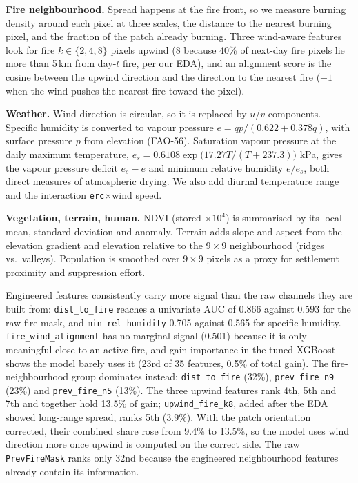 \textbf{Fire neighbourhood.} Spread happens at the fire front, so we measure burning density
around each pixel at three scales, the distance to the nearest burning pixel, and the fraction of
the patch already burning. Three wind-aware features look for fire $k \in \{2,4,8\}$ pixels upwind (8 because 40\% of
next-day fire pixels lie more than 5\,km from day-$t$ fire, per our EDA), and an
alignment score is the cosine between the upwind direction and the direction to the nearest fire
($+1$ when the wind pushes the nearest fire toward the pixel).

\textbf{Weather.} Wind direction is circular, so it is replaced by $u$/$v$ components.
Specific humidity is converted to vapour pressure $e = qp/(0.622+0.378q)$, with surface pressure
$p$ from elevation (FAO-56). Saturation vapour pressure at the daily maximum temperature,
$e_s = 0.6108\exp\!\big(17.27T/(T+237.3)\big)$ kPa, gives the vapour pressure deficit
$e_s - e$ and minimum relative humidity $e/e_s$, both direct measures of atmospheric drying.
We also add diurnal temperature range and the interaction \texttt{erc}$\times$wind speed.

\textbf{Vegetation, terrain, human.} NDVI (stored $\times10^4$) is summarised by its local mean,
standard deviation and anomaly. Terrain adds slope and aspect from the elevation gradient and
elevation relative to the $9\times9$ neighbourhood (ridges vs.\ valleys). Population is
smoothed over $9\times9$ pixels as a proxy for settlement proximity and suppression effort.

Engineered features consistently carry more signal than the raw channels they are built from:
\texttt{dist\_to\_fire} reaches a univariate AUC of 0.866 against 0.593 for the raw fire mask,
and \texttt{min\_rel\_humidity} 0.705 against 0.565 for specific humidity.
\texttt{fire\_wind\_alignment} has no marginal signal (0.501) because it is only meaningful close
to an active fire, and gain importance in the tuned XGBoost shows the model barely uses it
(23rd of 35 features, 0.5\% of total gain). The fire-neighbourhood group dominates instead:
\texttt{dist\_to\_fire} (32\%), \texttt{prev\_fire\_n9} (23\%) and \texttt{prev\_fire\_n5} (13\%).
The three upwind features rank 4th, 5th and 7th and together hold 13.5\% of gain;
\texttt{upwind\_fire\_k8}, added after the EDA showed long-range spread, ranks 5th (3.9\%).
With the patch orientation corrected, their combined share rose from 9.4\% to 13.5\%,
so the model uses wind direction more once upwind is computed on the correct side.
The raw \texttt{PrevFireMask} ranks only 32nd because the engineered neighbourhood features already
contain its information.

